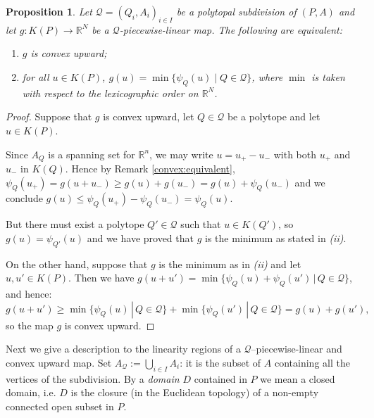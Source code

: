 \documentclass[12pt, a4article]{amsart}   	%
\numberwithin{equation}{section}
\theoremstyle{plain}
\newtheorem{proposition}[theorem]{Proposition}
\theoremstyle{definition}
\newcommand{\mcQ}{{\mathcal Q}}
\begin{document}
\begin{proposition}\label{prop:convex:up:=:minimum}
Let $\mathcal Q=(Q_i,A_i)_{i\in I}$ be a polytopal subdivision of  $(P, A)$ and let $g:K(P)\rightarrow \mathbb R^N$ be a $\mathcal Q$-piecewise-linear map. The following are equivalent:
\begin{enumerate}
\item[\rm (i)] $g$ is convex upward;
\item[\rm (ii)] for all $u\in K(P)$, $g(u)=\min\{\psi_{Q}( u)\mid Q\in \mathcal Q\}$, where $\min$ is taken with respect to the lexicographic order on $\mathbb R^N$.
\end{enumerate}
\end{proposition}

\begin{proof} Suppose that $g$ is convex upward, let $Q\in\mathcal{Q}$ be a polytope and let $u\in K(P)$.

Since $A_Q$ is a spanning set for $\mathbb{R}^n$, we may write $u = u_+- u_-$ with both $u_+$ and $u_-$ in $K(Q)$. Hence by Remark \ref{convex:equivalent}, $\psi_Q(u_+)=g(u+u_-)\geq g(u) + g(u_-) = g(u) + \psi_Q(u_-)$ and we conclude $g(u)\leq \psi_Q(u_+) - \psi_Q(u_-) = \psi_Q(u)$.

But there must exist a polytope $Q'\in\mathcal Q$ such that $u\in K(Q')$, so $g(u) = \psi_{Q'}( u)$ and we have proved that $g$ is the minimum as stated in \emph{(ii)}.

On the other hand, suppose that $g$ is the minimum as in \emph{(ii)} and let $  u,  u'\in K(P)$. Then we have
$g(u + u')  = \min\{\psi_Q(  u) + \psi_Q(  u')\,|\,Q\in\mathcal Q\} $, and hence:
$$g(u + u')   \geq    \min\{\psi_Q(  u)\,|\,Q\in\mathcal Q\} + \min\{\psi_Q(  u')\,|\,Q\in\mathcal Q\}=g(u) + g(u'),$$
so the map $g$ is convex upward.
\end{proof}

Next we give a description to the linearity regions of a $\mcQ$--piecewise-linear and convex upward map. Set 
$A_{\mathcal Q}:=\bigcup_{i\in I} A_i$: it is the subset of $A$ containing all the vertices of the subdivision. 
By a \emph{domain $D$} contained in $P$ we mean a closed domain, i.e. $D$ is the closure 
(in the Euclidean topology) of a non-empty connected open subset in $P$.
\end{document}
